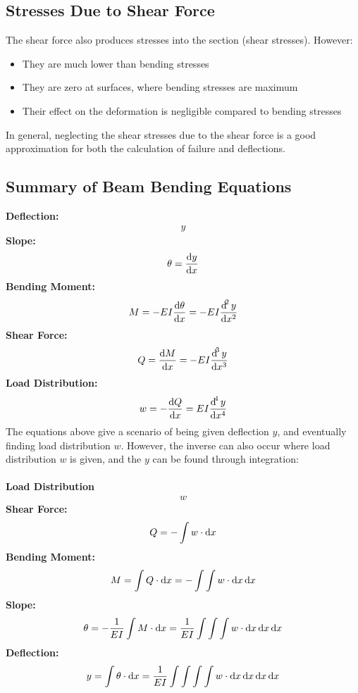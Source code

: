\documentclass[class=report, crop=false, 12pt,a4paper]{standalone}
\begin{document}
\subsection{Stresses Due to Shear Force}
The shear force also produces stresses into the section (shear stresses). However:
\begin{itemize}[noitemsep]
  \item They are much lower than bending stresses
  \item They are zero at surfaces, where bending stresses are maximum
  \item Their effect on the deformation is negligible compared to bending stresses
\end{itemize}
In general, neglecting the shear stresses due to the shear force is a good approximation for both the calculation of failure and deflections.
\subsection{Summary of Beam Bending Equations}
\textbf{Deflection:}
\begin{gather}
  y
\end{gather}
\textbf{Slope:}
\begin{gather}
  \theta = \frac{\dif y}{\dif x}
\end{gather}
\textbf{Bending Moment:}
\begin{gather}
  M = -EI\frac{\dif \theta}{\dif x} = -EI\frac{\dif^2y}{\dif x^2}
\end{gather}
\textbf{Shear Force:}
\begin{gather}
  Q = \frac{\dif M}{\dif x} = -EI\frac{\dif^3y}{\dif x^3}
\end{gather}
\textbf{Load Distribution:}
\begin{gather}
  w = -\frac{\dif Q}{\dif x} = EI\frac{\dif^4y}{\dif x^4}
\end{gather}
The equations above give a scenario of being given deflection $y$, and eventually finding load distribution $w$. However, the inverse can also occur where load distribution $w$ is given, and the $y$ can be found through integration: \\\\
\textbf{Load Distribution}
\begin{gather}
  w
\end{gather}
\textbf{Shear Force:}
\begin{gather}
  Q = -\int w \cdot \dif x
\end{gather}
\textbf{Bending Moment:}
\begin{gather}
  M = \int Q \cdot \dif x = -\int \int w \cdot \dif x \dif x
\end{gather}
\textbf{Slope:}
\begin{gather}
  \theta = -\frac{1}{EI}\int M \cdot \dif x = \frac{1}{EI}\int \int \int w \cdot \dif x \dif x \dif x
\end{gather}
\textbf{Deflection:}
\begin{gather}
  y = \int \theta \cdot \dif x = \frac{1}{EI}\int \int \int \int w \cdot \dif x \dif x \dif x \dif x
\end{gather}
\end{document}
